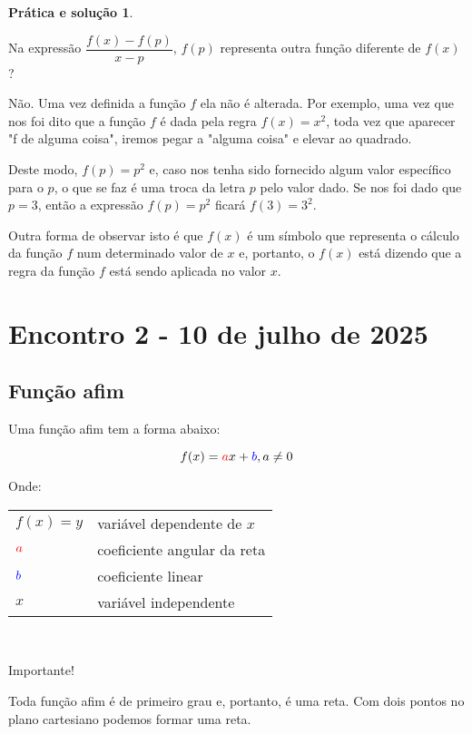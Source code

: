 \documentclass[12pt,openright,twoside,a4paper]{article}
\makeatletter
\theoremstyle{definition}
\newtheorem{practice}{Prática e solução}[section]
\newenvironment{condicoes}[1][Onde:]
{#1 \begin{tabular}[t]{>{$}l<{$} @{${} \implies {}$} l}}
	{\end{tabular}\\[\belowdisplayskip]}
\makeatother
\begin{document}
\begin{practice}
\begin{snugshade}
			Na expressão $\dfrac{f(x) - f(p)}{x - p}$, $f(p)$ representa outra função diferente de $f(x)$?
			
			Não. Uma vez definida a função $f$ ela não é alterada. Por exemplo, uma vez que nos foi dito que a função $f$ é dada pela regra $f(x) = x^2$, toda vez que aparecer "f de alguma coisa", iremos pegar a "alguma coisa" e elevar ao quadrado. 
			
			Deste modo, $f(p) = p^2$ e, caso nos tenha sido fornecido algum valor específico para o $p$, o que se faz é uma troca da letra $p$ pelo valor dado. Se nos foi dado que $p = 3$, então a expressão $f(p) = p^2$ ficará $f(3) = 3^2$.
			
			Outra forma de observar isto é que $f(x)$ é um símbolo que representa o cálculo da função $f$ num determinado valor de $x$ e, portanto, o $f(x)$ está dizendo que a regra da função $f$ está sendo aplicada no valor $x$.
		\end{snugshade}
		
	\end{practice}
	
	\pagebreak
	\section{Encontro 2 - 10 de julho de 2025}
	
	\subsection{Função afim}
	Uma função afim tem a forma abaixo:
	
	\begin{equation}
		f(x) = \textcolor{red}{a}x + \textcolor{blue}{b}, a \neq 0
	\end{equation}
	
	\begin{condicoes}
		f(x)=y & variável dependente de $x$\\
		\textcolor{red}{a} & coeficiente angular da reta\\
		\textcolor{blue}{b} & coeficiente linear\\
		x & variável independente    
	\end{condicoes}
	
	\begin{snugshade}
		{\color{red}Importante!}
		
		Toda função afim é de primeiro grau e, portanto, é uma reta. Com dois pontos no plano cartesiano podemos formar uma reta.
	\end{snugshade}
	
\end{document}
